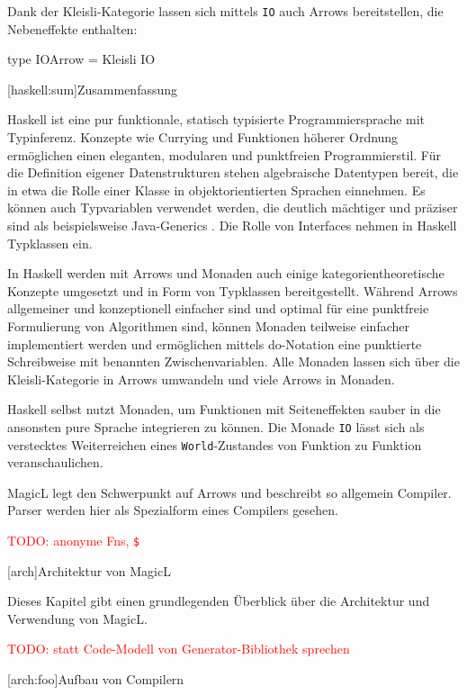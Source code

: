 \documentclass[11pt, a4paper, bibgerm]{scrbook}
\newenvironment{DIFnomarkup}{}{}
\newcommand\icode[1]{\lstinline?#1?}
\newcommand{\todo}[1]{
  \textcolor{red}{TODO: #1}
}
\newcommand\lchapter{}
\newcommand\lsection{}
\begin{document}
Dank der Kleisli-Kategorie lassen sich mittels \icode{IO} auch Arrows
bereitstellen, die Nebeneffekte enthalten:
\begin{DIFnomarkup}\begin{code}
type IOArrow = Kleisli IO
\end{code}\end{DIFnomarkup}

\lsection[haskell:sum]{Zusammenfassung}

Haskell ist eine pur funktionale, statisch typisierte Programmiersprache
mit Typinferenz. Konzepte wie Currying und Funktionen höherer Ordnung
ermöglichen einen eleganten, modularen und punktfreien
Programmierstil. Für die Definition eigener Datenstrukturen stehen
algebraische Datentypen bereit, die in etwa die Rolle einer Klasse in
objektorientierten Sprachen einnehmen. Es können auch Typvariablen
verwendet werden, die deutlich mächtiger und präziser sind als
beispielsweise Java-Generics \cite{JavaGenerics}. Die Rolle von
Interfaces nehmen in Haskell Typklassen ein.

In Haskell werden mit Arrows und Monaden auch einige
kategorientheoretische Konzepte umgesetzt und in Form von Typklassen
bereitgestellt. Während Arrows allgemeiner und konzeptionell einfacher
sind und optimal für eine punktfreie Formulierung von Algorithmen sind,
können Monaden teilweise einfacher implementiert werden und ermöglichen
mittels do-Notation eine punktierte Schreibweise mit benannten
Zwischenvariablen. Alle Monaden lassen sich über die Kleisli-Kategorie
in Arrows umwandeln und viele Arrows in Monaden.

Haskell selbst nutzt Monaden, um Funktionen mit Seiteneffekten sauber in
die ansonsten pure Sprache integrieren zu können. Die Monade \icode{IO}
lässt sich als verstecktes Weiterreichen eines \icode{World}-Zustandes von
Funktion zu Funktion veranschaulichen.

MagicL legt den Schwerpunkt auf Arrows und beschreibt so allgemein
Compiler. Parser werden hier als Spezialform eines Compilers gesehen.

\todo{anonyme Fns, \icode{$}} %

\lchapter[arch]{Architektur von MagicL}

Dieses Kapitel gibt einen grundlegenden Überblick über die Architektur
und Verwendung von MagicL.

\todo{statt Code-Modell von Generator-Bibliothek sprechen}

\lsection[arch:foo]{Aufbau von Compilern}
\end{document}
